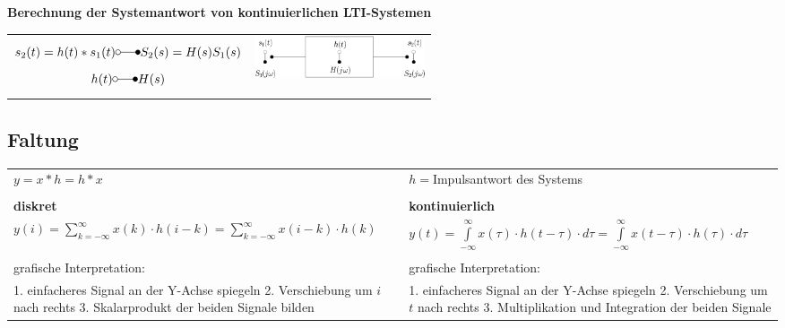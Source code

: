 		\textbf{Berechnung der Systemantwort von kontinuierlichen LTI-Systemen}\\
		\begin{tabular}{ll}
			\parbox{8cm}{
			$$s_2(t) = h(t) * s_1(t) \laplace S_2(s) = H(s) S_1(s)$$
			$$h(t) \laplace H(s)$$}
			& \parbox{8cm}{
			\includegraphics[width=5cm]{./bilder/utf-theorie.png}}\\
		\end{tabular}	
		
	\subsection{Faltung}
		\begin{tabular}{ll}
	        $\boxed{y=x*h=h*x}$&$h=$Impulsantwort des Systems\\ & \\
	   		\textbf{diskret}& \textbf{kontinuierlich}\\
	   		$\boxed{y(i)=\sum\limits_{k=-\infty}^{\infty}x(k)\cdot
	   		h(i-k)=\sum\limits_{k=-\infty}^{\infty}x(i-k)\cdot h(k)}$&
	   		$\boxed{y(t)=\int\limits_{-\infty}^{\infty}x(\tau)\cdot
	   		h(t-\tau)\cdot d\tau=\int\limits_{-\infty}^{\infty}x(t-\tau)\cdot
	   		h(\tau)\cdot d\tau}$\\ & \\
	   		grafische Interpretation: & grafische Interpretation:\\
	   		\parbox{8cm}{1. einfacheres Signal an der Y-Achse spiegeln\\
	   					2. Verschiebung um  $i$ nach rechts\\
	   					3. Skalarprodukt der beiden Signale bilden}&
			\parbox{8cm}{1. einfacheres Signal an der Y-Achse spiegeln\\
			 			2. Verschiebung um $t$ nach rechts\\
			 			3. Multiplikation und Integration der beiden Signale}		
        \end{tabular}
	